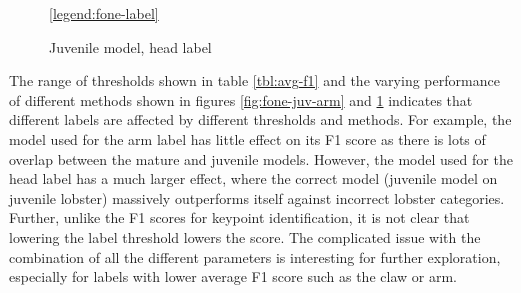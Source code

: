 \begin{figure}[H]
\centering
{}
\ref{legend:fone-label}
\caption{Juvenile model, head label}
\label{fig:fone-juv-head}
\end{figure}
\noindent
The range of thresholds shown in table \ref{tbl:avg-f1} and the varying performance of different methods shown in figures \ref{fig:fone-juv-arm} and \ref{fig:fone-juv-head} indicates that different labels are affected by different thresholds and methods. For example, the model used for the arm label has little effect on its F1 score as there is lots of overlap between the mature and juvenile models. However, the model used for the head label has a much larger effect, where the correct model (juvenile model on juvenile lobster) massively outperforms itself against incorrect lobster categories. Further, unlike the F1 scores for keypoint identification, it is not clear that lowering the label threshold lowers the score. The complicated issue with the combination of all the different parameters is interesting for further exploration, especially for labels with lower average F1 score such as the claw or arm. 



